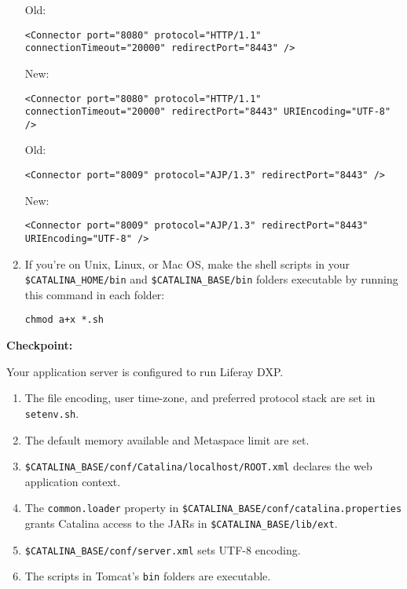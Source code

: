 \begin{enumerate}
  Old:

\begin{verbatim}
<Connector port="8080" protocol="HTTP/1.1" connectionTimeout="20000" redirectPort="8443" />
\end{verbatim}

  New:

\begin{verbatim}
<Connector port="8080" protocol="HTTP/1.1" connectionTimeout="20000" redirectPort="8443" URIEncoding="UTF-8" />
\end{verbatim}

  Old:

\begin{verbatim}
<Connector port="8009" protocol="AJP/1.3" redirectPort="8443" />
\end{verbatim}

  New:

\begin{verbatim}
<Connector port="8009" protocol="AJP/1.3" redirectPort="8443" URIEncoding="UTF-8" />
\end{verbatim}
\item
  If you're on Unix, Linux, or Mac OS, make the shell scripts in your
  \texttt{\$CATALINA\_HOME/bin} and \texttt{\$CATALINA\_BASE/bin}
  folders executable by running this command in each folder:

  \texttt{chmod\ a+x\ *.sh}
\end{enumerate}

\textbf{Checkpoint:}

Your application server is configured to run Liferay DXP.

\begin{enumerate}
\def\labelenumi{\arabic{enumi}.}
\item
  The file encoding, user time-zone, and preferred protocol stack are
  set in \texttt{setenv.sh}.
\item
  The default memory available and Metaspace limit are set.
\item
  \texttt{\$CATALINA\_BASE/conf/Catalina/localhost/ROOT.xml} declares
  the web application context.
\item
  The \texttt{common.loader} property in
  \texttt{\$CATALINA\_BASE/conf/catalina.properties} grants Catalina
  access to the JARs in \texttt{\$CATALINA\_BASE/lib/ext}.
\item
  \texttt{\$CATALINA\_BASE/conf/server.xml} sets UTF-8 encoding.
\item
  The scripts in Tomcat's \texttt{bin} folders are executable.
\end{enumerate}

